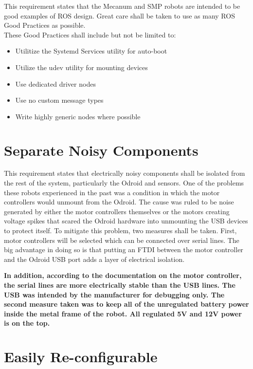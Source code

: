 This requirement states that the Mecanum and SMP robots are intended to be good examples of ROS design. Great care shall be taken to use as many ROS Good Practices as possible.\\

These Good Practices shall include but not be limited to:

\begin{itemize}
	\item{Utilitize the Systemd Services utility for auto-boot}
	\item{Utilize the udev utility for mounting devices}
	\item{Use dedicated driver nodes}
	\item{Use no custom message types}
	\item{Write highly generic nodes where possible}
\end{itemize}

\section{Separate Noisy Components}

This requirement states that electrically noisy components shall be isolated from the rest of the system, particularly the Odroid and sensors. One of the problems these robots experienced in the past was a condition in which the motor controllers would unmount from the Odroid. The cause was ruled to be noise generated by either the motor controllers themselves or the motors creating voltage spikes that scared the Odroid hardware into unmounting the USB devices to protect itself. To mitigate this problem, two measures shall be taken. First, motor controllers will be selected which can be connected over serial lines. The big advantage in doing so is that putting an FTDI between the motor controller and the Odroid USB port adds a layer of electrical isolation.

\textbf{In addition, according to the documentation on the motor controller, the serial lines are more electrically stable than the USB lines. The USB was intended by the manufacturer for debugging only. The second measure taken was to keep all of the unregulated battery power inside the metal frame of the robot. All regulated 5V and 12V power is on the top.}

\section{Easily Re-configurable}

